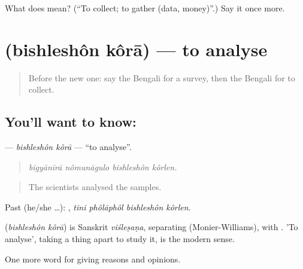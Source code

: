 \begin{tcolorbox}[breakable,colback=teal!4,colframe=teal!35!black,title={Before you move on}]
What does   mean? (\textquotedblleft{}To collect; to gather (data, money)\textquotedblright{}.) Say it once more.
\end{tcolorbox}
\section[\texorpdfstring{\bn{বিশ্লেষণ} \bn{করা} (bishleshôn kôrā)}{বিশ্লেষণ করা (bishleshôn kôrā)}]{  (bishleshôn kôrā) — to analyse}

\label{lesson:BN-C355-bishleshon-kora}



\begin{quote}
Before the new one: say the Bengali for a survey, then the Bengali for to collect.
\end{quote}

\subsection*{You'll want to know:  }
\textbf{ } — \emph{bishleshôn kôrā} — \textquotedblleft{}to analyse\textquotedblright{}.

\begin{quote}
   
\end{quote}

\begin{quote}
\emph{bigyānīrā nômunāgulo bishleshôn kôrlen.}
\end{quote}

\begin{quote}
The scientists analysed the samples.
\end{quote}

Past (he/she …):    , \emph{tini phôlāphôl bishleshôn kôrlen}.

\begin{cousinweb}
\textbf{ } (\emph{bishleshôn kôrā}) is Sanskrit \emph{viśleṣaṇa}, separating (Monier-Williams), with . 'To analyse', taking a thing apart to study it, is the modern sense.
\end{cousinweb}

\begin{grammarlens}[title={What you've built}]
One more word for giving reasons and opinions.
\end{grammarlens}

